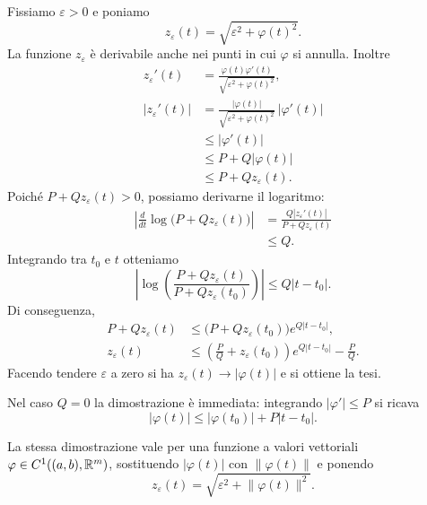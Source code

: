 \documentclass[a4paper]{article}
\begin{document}
\begin{radioactive}
\begin{snippetproof}{}
Fissiamo \(\varepsilon>0\) e poniamo
\[
	z_\varepsilon(t)=\sqrt{\varepsilon^2+\varphi(t)^2}.
\]
La funzione \(z_\varepsilon\) è derivabile anche nei punti in cui \(\varphi\) si annulla. Inoltre
\begin{align*}
	z_\varepsilon'(t)
	&=\frac{\varphi(t)\varphi'(t)}{\sqrt{\varepsilon^2+\varphi(t)^2}},\\
	|z_\varepsilon'(t)|
	&=\frac{|\varphi(t)|}{\sqrt{\varepsilon^2+\varphi(t)^2}}\,|\varphi'(t)|\\
	&\leq |\varphi'(t)|\\
	&\leq P+Q|\varphi(t)|\\
	&\leq P+Qz_\varepsilon(t).
\end{align*}
Poiché \(P+Qz_\varepsilon(t)>0\), possiamo derivarne il logaritmo:
\begin{align*}
	\left|\frac{d}{dt}\log\bigl(P+Qz_\varepsilon(t)\bigr)\right|
	&=\frac{Q|z_\varepsilon'(t)|}{P+Qz_\varepsilon(t)}\\
	&\leq Q.
\end{align*}
Integrando tra \(t_0\) e \(t\) otteniamo
\[
	\left|
		\log\left(\frac{P+Qz_\varepsilon(t)}{P+Qz_\varepsilon(t_0)}\right)
	\right|
	\leq Q|t-t_0|.
\]
Di conseguenza,
\begin{align*}
	P+Qz_\varepsilon(t)
	&\leq \bigl(P+Qz_\varepsilon(t_0)\bigr)e^{Q|t-t_0|},\\
	z_\varepsilon(t)
	&\leq
	\left(\frac{P}{Q}+z_\varepsilon(t_0)\right)e^{Q|t-t_0|}-\frac{P}{Q}.
\end{align*}
Facendo tendere \(\varepsilon\) a zero si ha \(z_\varepsilon(t)\to|\varphi(t)|\) e si ottiene la tesi.
\end{snippetproof}
\end{radioactive}

\begin{radioactive}
Nel caso \(Q=0\) la dimostrazione è immediata: integrando \(|\varphi'|\leq P\) si ricava
\[
	|\varphi(t)|\leq |\varphi(t_0)|+P|t-t_0|.
\]

La stessa dimostrazione vale per una funzione a valori vettoriali \(\varphi\in C^1((a,b),\mathbb{R}^m)\), sostituendo \(|\varphi(t)|\) con \(\lVert\varphi(t)\rVert\) e ponendo
\[
	z_\varepsilon(t)=\sqrt{\varepsilon^2+\lVert\varphi(t)\rVert^2}.
\]
\end{radioactive}
\end{document}

